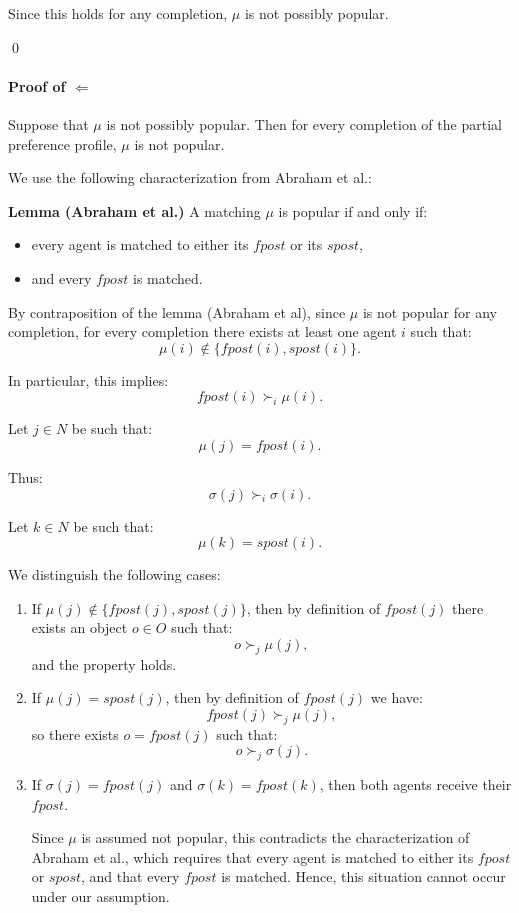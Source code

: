 \documentclass{article}
\begin{document}
\medskip

Since this holds for any completion, $\mu$ is not possibly popular.

\qed


\paragraph{Proof of $\Leftarrow$}

Suppose that $\mu$ is not possibly popular. Then for every completion of the partial preference profile, $\mu$ is not popular.

We use the following characterization from Abraham et al.:

\medskip

\textbf{Lemma (Abraham et al.)}  
A matching $\mu$ is popular if and only if:
\begin{itemize}
    \item every agent is matched to either its $fpost$ or its $spost$,
    \item and every $fpost$ is matched.
\end{itemize}

\medskip

By contraposition of the lemma (Abraham et al), since $\mu$ is not popular for any completion, for every completion there exists at least one agent $i$ such that:
\[
\mu(i) \notin \{fpost(i), spost(i)\}.
\]

In particular, this implies:
\[
fpost(i) \succ_i \mu(i).
\]

Let $j \in N$ be such that:
\[
\mu(j) = fpost(i).
\]

Thus:
\[
\sigma(j) \succ_i \sigma(i).
\]

Let $k \in N$ be such that:
\[
\mu(k) = spost(i).
\]

We distinguish the following cases:

\begin{enumerate}
    \item If $\mu(j) \notin \{fpost(j), spost(j)\}$, then by definition of $fpost(j)$ there exists an object $o \in O$ such that:
    \[
    o \succ_j \mu(j),
    \]
    and the property holds.

    \item If $\mu(j) = spost(j)$, then by definition of $fpost(j)$ we have:
    \[
    fpost(j) \succ_j \mu(j),
    \]
    so there exists $o = fpost(j)$ such that:
    \[
    o \succ_j \sigma(j).
    \]

    \item If $\sigma(j) = fpost(j)$ and $\sigma(k) = fpost(k)$, then both agents receive their $fpost$.

    Since $\mu$ is assumed not popular, this contradicts the characterization of Abraham et al., which requires that every agent is matched to either its $fpost$ or $spost$, and that every $fpost$ is matched. Hence, this situation cannot occur under our assumption.

\end{enumerate}
\end{document}
